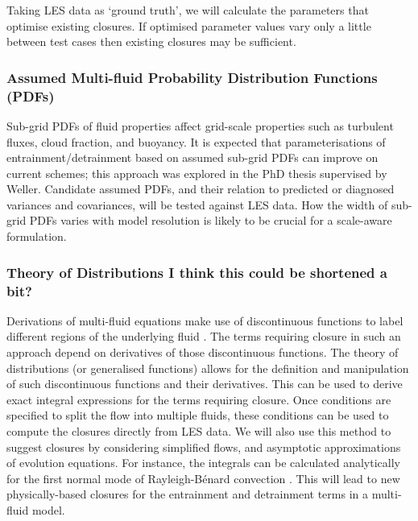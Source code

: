 \documentclass[11pt,a4paper]{article}
\begin{document}
Taking LES data as `ground truth', we will calculate the parameters that optimise existing closures. If optimised parameter values vary only a little between test cases then existing closures may be sufficient.

\subsubsection*{Assumed Multi-fluid Probability Distribution Functions (PDFs)}

Sub-grid PDFs of fluid properties affect grid-scale properties such as turbulent fluxes, cloud fraction, and buoyancy. It is expected that parameterisations of entrainment/detrainment based on assumed sub-grid PDFs can improve on current schemes; this approach was explored in the PhD thesis \cite{McIn20} supervised by Weller. Candidate assumed PDFs, and their relation to predicted or diagnosed variances and covariances, will be tested against LES data.
How the width of sub-grid PDFs varies with model resolution is likely to be crucial for a scale-aware formulation.


\subsubsection*{Theory of Distributions {\color{red} I think this could be shortened a bit?}}

Derivations of multi-fluid equations make use of discontinuous functions to label different regions of the underlying fluid \cite[]{Dopa77,TWV+18}. The terms requiring closure in such an approach depend on derivatives of those discontinuous functions. The theory of distributions (or generalised functions) \cite[]{Schw08} allows for the definition and manipulation of such discontinuous functions and their derivatives. This can be used to derive exact integral expressions for the terms requiring closure. Once conditions are specified to split the flow into multiple fluids, these conditions can be used to compute the closures directly from LES data. We will also use this method to suggest closures by considering simplified flows, and asymptotic approximations of evolution equations. For instance, the integrals can be calculated analytically for the first normal mode of Rayleigh-B\'{e}nard convection  \cite[]{SWCM2x}. This will lead to new physically-based closures for the entrainment and detrainment terms in a multi-fluid model. 
\end{document}
